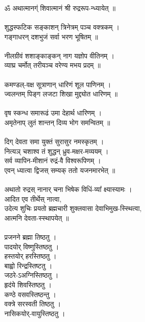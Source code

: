 \section{}
\\
ॐ अथात्मानग्ं शिवात्मानं श्री रुद्ररूप-न्ध्यायेत् ॥\\
\\
शुद्धस्फटिक सङ्काशन् त्रिनेत्रम् पञ्च वक्त्रकम् ।\\
गङ्गाधरन् दशभुजं सर्वा भरण भूषितम् ॥\\
\\
नीलग्रीवं शशाङ्काङ्कन् नाग यज्ञोप वीतिनम् ।\\
व्याघ्र चर्मोत् तरीयञ्च वरेण्य मभय प्रदम् ॥\\
\\
कमण्डल्-वक्ष सूत्राणान् धारिणं शूल पाणिनम् ।\\
ज्वलन्तम् पिङ्ग लजटा शिखा मुद्द्योत धारिणम् ॥\\
\\
वृष स्कन्ध समारूढं उमा देहार्थ धारिणम् ।\\
अमृतेनाप् लुतं शान्तन् दिव्य भोग समन्वितम् ॥\\
\\
दिग् देवता समा युक्तं सुरासुर नमस्कृतम् ।\\
नित्यञ् चशाश्व तं शुद्धन् ध्रुव-मक्षर-मव्ययम् ।\\
सर्व व्यापिन-मीशानं रुद्रं-वै विश्वरूपिणम् ।\\
एवन् ध्यात्वा द्विजस् सम्यक् ततो यजनमारभेत् ॥\\
\\
अथातो रुद्रस् नानार् चना भिषेक विधिं-व्या᳚ क्ष्यास्यामः ।\\
आदित एव तीर्थेस् नात्वा,\\
उदेत्य शुचिः प्रयतो ब्रह्मचारी शुक्लवासा देवाभिमुख-स्स्थित्वा,\\
आत्मनि देवता-स्स्थापयेत् ॥\\
\\
प्रजनने ब्रह्मा तिष्ठतु ।\\
पादयोर् विष्णुस्तिष्ठतु ।\\
हस्तयोर्​ हरस्तिष्ठतु ।\\
बाह्वो रिन्द्रस्तिष्टतु ।\\
जठरे-ऽअग्निस्तिष्ठतु ।\\
हृद॑ये शिवस्तिष्ठतु ।\\
कण्ठे वसवस्तिष्ठन्तु ।\\
वक्त्रे सरस्वती तिष्ठतु ।\\
नासिकयोर्-वायुस्तिष्ठतु ।\\
